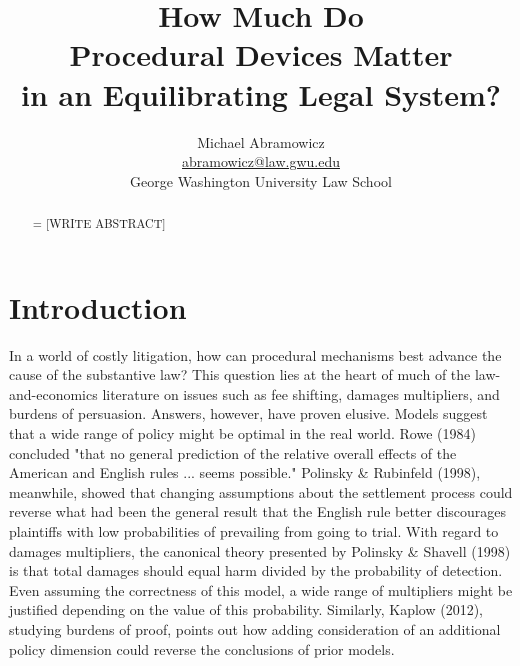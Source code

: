 \documentclass{article}
\newenvironment{nohyphen}
  {\tolerance=1%
   \emergencystretch=\maxdimen%
   \hyphenpenalty=10000%
   \hbadness=10000}%
  {\par}%
\begin{document}
\title{How Much Do \\ Procedural Devices Matter \\ in an Equilibrating Legal System?}
\author{Michael Abramowicz \\ \href{mailto:abramowicz@law.gwu.edu}{abramowicz@law.gwu.edu} \\ George Washington University Law School}

\maketitle

\begin{abstract}
\begin{nohyphen}
[WRITE ABSTRACT]
\end{nohyphen}
\end{abstract}

\section{Introduction}

In a world of costly litigation, how can procedural mechanisms best advance the cause of the substantive law? This question lies at the heart of much of the law-and-economics literature on issues such as fee shifting, damages multipliers, and burdens of persuasion. Answers, however, have proven elusive. Models suggest that a wide range of policy might be optimal in the real world. Rowe (1984) concluded "that no general prediction of the relative overall effects of the American and English rules ... seems possible." Polinsky \& Rubinfeld (1998), meanwhile, showed that changing assumptions about the settlement process could reverse what had been the general result that the English rule better discourages plaintiffs with low probabilities of prevailing from going to trial. With regard to damages multipliers, the canonical theory presented by Polinsky \& Shavell (1998) is that total damages should equal harm divided by the probability of detection. Even assuming the correctness of this model, a wide range of multipliers might be justified depending on the value of this probability. Similarly, Kaplow (2012), studying burdens of proof, points out how adding consideration of an additional policy dimension could reverse the conclusions of prior models. 
\end{document}
